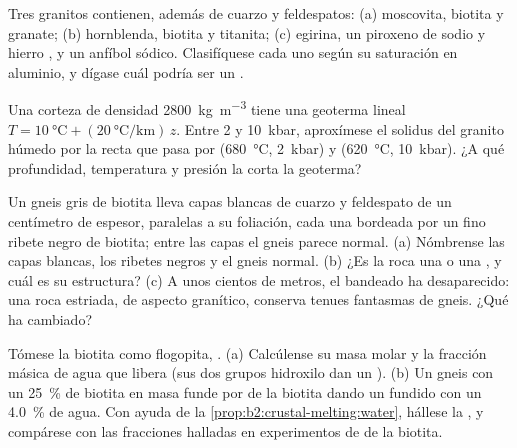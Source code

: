 \begin{exercise}[$\star$]\label{exo:b2:crustal-melting:2}
Tres granitos contienen, además de cuarzo y feldespatos: (a) moscovita, biotita y granate;
(b) hornblenda, biotita y titanita; (c) egirina, un piroxeno de sodio y hierro
, y un anfíbol sódico. Clasifíquese cada uno según su saturación en aluminio, y dígase
cuál podría ser un .
\end{exercise}

\begin{exercise}[$\star$]\label{exo:b2:crustal-melting:3}
Una corteza de densidad \qty{2800}{\kilogram\per\cubic\metre} tiene una geoterma lineal
$T = \qty{10}{\celsius} + (\qty{20}{\celsius\per\kilo\metre})\,z$. Entre 2 y
\qty{10}{kbar}, aproxímese el solidus del granito húmedo por la recta que pasa por
(\qty{680}{\celsius}, \qty{2}{kbar}) y (\qty{620}{\celsius}, \qty{10}{kbar}). ¿A qué
profundidad, temperatura y presión la corta la geoterma?
\end{exercise}

\begin{exercise}[$\star$]\label{exo:b2:crustal-melting:4}
Un gneis gris de biotita lleva capas blancas de cuarzo y feldespato de un centímetro de espesor, paralelas
a su foliación, cada una bordeada por un fino ribete negro de biotita; entre las capas el
gneis parece normal. (a) Nómbrense las capas blancas, los ribetes negros y el gneis normal.
(b) ¿Es la roca una  o una , y cuál es su estructura? (c) A unos cientos de
metros, el bandeado ha desaparecido: una roca estriada, de aspecto granítico, conserva tenues fantasmas de
gneis. ¿Qué ha cambiado?
\end{exercise}

\begin{exercise}[$\star\star$]\label{exo:b2:crustal-melting:5}
Tómese la biotita como flogopita, . (a) Calcúlense su masa molar y la
fracción másica de agua que libera (sus dos grupos hidroxilo dan un ).
(b) Un gneis con un \qty{25}{\percent} de biotita en masa funde por  de la biotita
dando un fundido con un \qty{4.0}{\percent} de agua. Con ayuda de la
\cref{prop:b2:crustal-melting:water}, hállese la , y compárese con las
fracciones halladas en experimentos de  de la biotita.
\end{exercise}

